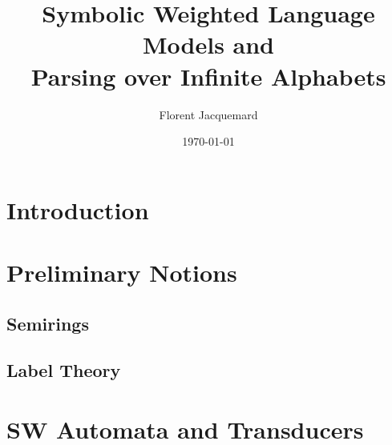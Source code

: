 \documentclass[runningheads]{llncs}
\title{Symbolic Weighted Language Models and\\ Parsing over Infinite Alphabets}
\author{Florent Jacquemard}
\institute{INRIA \& CNAM, Paris, France\\
\email{florent.jacquemard@inria.fr}}
\date{\today}
\begin{document}
\thispagestyle{empty}
\maketitle

\begin{abstract}

\end{abstract}





\section{Introduction} \label{sec:intro}




\section{Preliminary Notions}
\label{section:prelim}\label{sec:prelim}




\subsection{Semirings} 
\label{section:semiring}\label{sec:semiring}



\subsection{Label Theory}
\label{section:symbols}





\section{SW Automata and Transducers}
\label{section:transducer}\label{sec:transducer}
\label{section:SWA}\label{sec:SWA}
\label{section:SWT}\label{sec:SWT}
\end{document}
